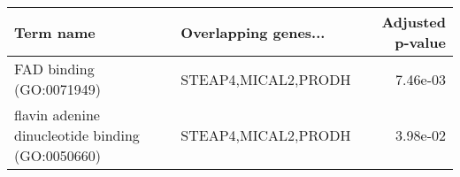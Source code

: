 \begin{tabular}{llr}
\toprule
                                       Term name & Overlapping genes... &  Adjusted p-value \\
\midrule
                        FAD binding (GO:0071949) &  STEAP4,MICAL2,PRODH &          7.46e-03 \\
flavin adenine dinucleotide binding (GO:0050660) &  STEAP4,MICAL2,PRODH &          3.98e-02 \\
\bottomrule
\end{tabular}
